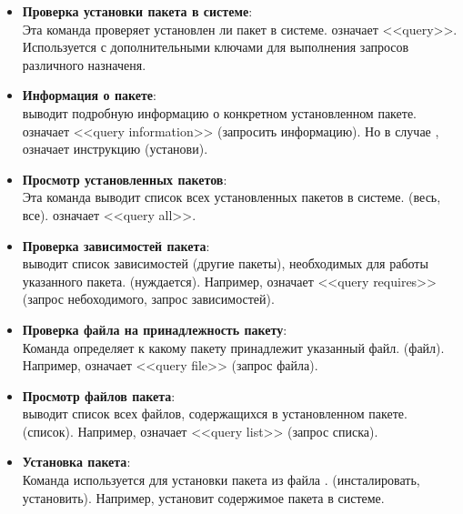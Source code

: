 \begin{itemize}
	\item \textbf{Проверка установки пакета в системе}: \\
	Эта команда проверяет установлен ли пакет в системе.  означает <<query>>.
	Используется с дополнительными ключами для выполнения запросов различного назначеня.

	\item \textbf{Информация о пакете}: \\
	 выводит подробную информацию о конкретном установленном пакете.  означает <<query information>>
	(запросить информацию). Но в случае ,  означает инструкцию  (установи).

	\item \textbf{Просмотр установленных пакетов}: \\
	Эта команда выводит список всех установленных пакетов в системе.  (весь, все).  означает <<query all>>.

	\item \textbf{Проверка зависимостей пакета}: \\
	  выводит список зависимостей (другие пакеты), необходимых для работы указанного пакета. 
	(нуждается). Например,  означает <<query requires>> (запрос небоходимого, запрос зависимостей).

	\item \textbf{Проверка файла на принадлежность пакету}: \\
	Команда  определяет к какому пакету принадлежит указанный файл. 
	(файл). Например,  означает <<query file>> (запрос файла).

	\item \textbf{Просмотр файлов пакета}: \\
	  выводит список всех файлов, содержащихся в установленном пакете. 
	(список). Например,  означает <<query list>> (запрос списка).

	\item \textbf{Установка пакета}: \\
	Команда  используется для установки пакета из файла . 
	(инсталировать, установить). Например,  установит содержимое пакета в системе.


\end{itemize}
